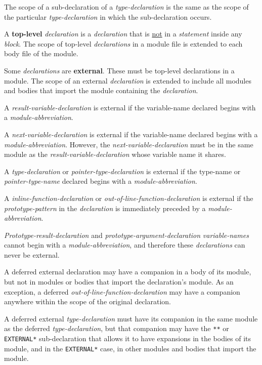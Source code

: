\documentclass[12pt]{article}
\newcommand{\key}[1]{{\rm \bfseries #1}}
\begin{document}
The scope of a sub-declaration of a {\em type-declaration} is
the same as the scope of the particular {\em type-declaration}
in which the sub-declaration occurs.

A \key{top-level} {\em declaration} is a {\em declaration} that is
\underline{not} in a {\em statement} inside any {\em block}.
The scope of top-level {\em declarations} in a module file is extended
to each body file of the module.

Some {\em declarations} are \key{external}\label{EXTERNAL}.
These must be top-level declarations in a module.
The scope of an external
{\em declaration} is extended to include all modules and bodies that
import the module containing the {\em declaration}.

A {\em result-variable-declaration}
is external if the {variable-name} declared begins with a
{\em module-abbreviation}.

A {\em next-variable-declaration}
is external if the {variable-name} declared begins with a
{\em module-abbreviation}.  However, the {\em next-variable-declaration}
must be in the same module as the {\em result-variable-declaration}
whose variable name it shares.

A {\em type-declaration} or {\em pointer-type-declaration}
\label{EXTERNAL-TYPE-NAME}
is external if the {type-name} or {\em pointer-type-name}
declared begins with a
{\em module-abbreviation}.

A {\em inline-function-declaration} or {\em out-of-line-function-declaration}
is external\label{EXTERNAL-FUNCTION}
if the {\em prototype-pattern} in the {\em declaration}
is immediately preceded by a {\em module-abbreviation}.

{\em Prototype-result-declaration} and {\em prototype-argument-declaration}
{\em variable-names} cannot begin with a {\em module-abbreviation},
and therefore these {\em declarations} can never be external.

A deferred external declaration may have a companion in a body of its module,
but not in modules or bodies that import the declaration's module.
As an exception, a deferred {\em out-of-line-function-declaration}
may have a companion
anywhere within the scope of the original declaration.

A deferred external {\em type-declaration} must have its
companion in the same module as the deferred {\em type-declaration},
but that companion may have the {\tt ***} or {\tt *EXTERNAL*}
sub-declaration that allows it to have expansions in the bodies of
its module, and in the {\tt *EXTERNAL*} case, in other modules and
bodies that import the module.
\end{document}
